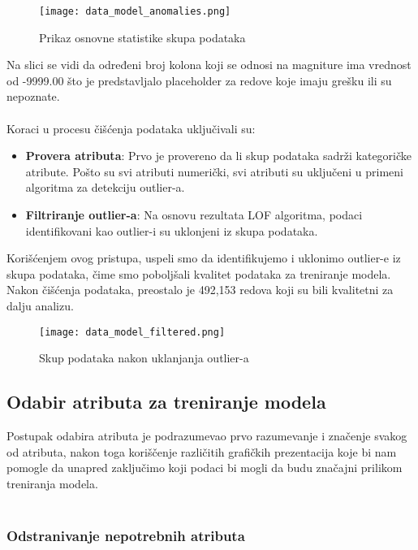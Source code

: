 \documentclass[a4paper,12pt]{article}
\begin{document}
\begin{figure}[h!]
\centering
\texttt{[image: data\_model\_anomalies.png]}
\caption{Prikaz osnovne statistike skupa podataka}
\label{fig:sql_query}
\end{figure}

Na slici se vidi da određeni broj kolona koji se odnosi na magniture ima vrednost od -9999.00 što je predstavljalo placeholder za redove koje imaju grešku ili su nepoznate.\\\\
Koraci u procesu čišćenja podataka uključivali su:
\begin{itemize}
    \item \textbf{Provera atributa}: Prvo je provereno da li skup podataka sadrži kategoričke atribute. Pošto su svi atributi numerički, svi atributi su uključeni u primeni algoritma za detekciju outlier-a.
    \item \textbf{Filtriranje outlier-a}: Na osnovu rezultata LOF algoritma, podaci identifikovani kao outlier-i su uklonjeni iz skupa podataka.
\end{itemize}
Korišćenjem ovog pristupa, uspeli smo da identifikujemo i uklonimo outlier-e iz skupa podataka, čime smo poboljšali kvalitet podataka za treniranje modela. Nakon čišćenja podataka, preostalo je 492,153 redova koji su bili kvalitetni za dalju analizu.

\begin{figure}[h!]
\centering
\texttt{[image: data\_model\_filtered.png]}
\caption{Skup podataka nakon uklanjanja outlier-a}
\label{fig:sql_query}
\end{figure}

\subsection{Odabir atributa za treniranje modela}

Postupak odabira atributa je podrazumevao prvo razumevanje i značenje svakog od atributa, nakon toga koriščenje različitih grafičkih prezentacija koje bi nam pomogle da unapred zaključimo koji podaci bi mogli da budu značajni prilikom treniranja modela.\\\\

\subsubsection{Odstranivanje nepotrebnih atributa}
\end{document}

